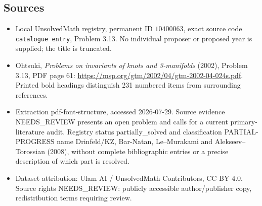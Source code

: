 \documentclass[11pt]{article}
\begin{document}
\subsection{Sources}
\begin{itemize}
\item Local UnsolvedMath registry, permanent ID \(10400063\), exact source code \texttt{catalogue entry}, Problem 3.13. No individual proposer or proposed year is supplied; the title is truncated.
\item Ohtsuki, \emph{Problems on invariants of knots and 3-manifolds} (2002), Problem 3.13, PDF page 61: \url{https://msp.org/gtm/2002/04/gtm-2002-04-024s.pdf}. Printed bold headings distinguish 231 numbered items from surrounding references.
\item Extraction pdf-font-structure, accessed 2026-07-29. Source evidence NEEDS\_REVIEW presents an open problem and calls for a current primary-literature audit. Registry status partially\_solved and classification PARTIAL-PROGRESS name Drinfeld/KZ, Bar-Natan, Le--Murakami and Alekseev--Torossian (2008), without complete bibliographic entries or a precise description of which part is resolved.
\item Dataset attribution: Ulam AI / UnsolvedMath Contributors, CC BY 4.0. Source rights NEEDS\_REVIEW: publicly accessible author/publisher copy, redistribution terms requiring review.
\end{itemize}
\end{document}
